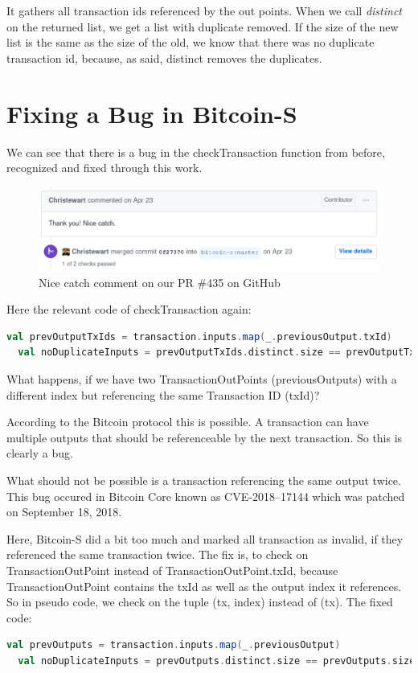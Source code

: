 It gathers all transaction ids referenced by the out points.
When we call \emph{distinct} on the returned list, we get a list with duplicate removed.
If the size of the new list is the same as the size of the old, we know that there was no duplicate transaction id, because, as said, distinct removes the duplicates.


\section{Fixing a Bug in Bitcoin-S}

We can see that there is a bug in the checkTransaction function from before, recognized and fixed through this work.

\begin{figure}[H]
	\centering
		\includegraphics[scale=0.5]{images/bitcoin-s-pr-comment.png}
	\caption{Nice catch comment on our PR \#435 on GitHub}
	\label{fig:output1}
\end{figure}

Here the relevant code of checkTransaction again:
\begin{lstlisting}[language=scala]
  val prevOutputTxIds = transaction.inputs.map(_.previousOutput.txId)
  val noDuplicateInputs = prevOutputTxIds.distinct.size == prevOutputTxIds.size
\end{lstlisting}

What happens, if we have two TransactionOutPoints (previousOutputs) with a different index but referencing the same Transaction ID (txId)?

According to the Bitcoin protocol this is possible.
A transaction can have multiple outputs that should be referenceable by the next transaction.
So this is clearly a bug.

What should not be possible is a transaction referencing the same output twice.
This bug occured in Bitcoin Core known as CVE-2018–17144 which was patched on September 18, 2018. \cite{cve201817144}

Here, Bitcoin-S did a bit too much and marked all transaction as invalid, if they referenced the same transaction twice.
The fix is, to check on TransactionOutPoint instead of TransactionOutPoint.txId, because TransactionOutPoint contains the txId as well as the output index it references.
So in pseudo code, we check on the tuple (tx, index) instead of (tx).
The fixed code:
\begin{lstlisting}[language=scala]
  val prevOutputs = transaction.inputs.map(_.previousOutput)
  val noDuplicateInputs = prevOutputs.distinct.size == prevOutputs.size
\end{lstlisting}

